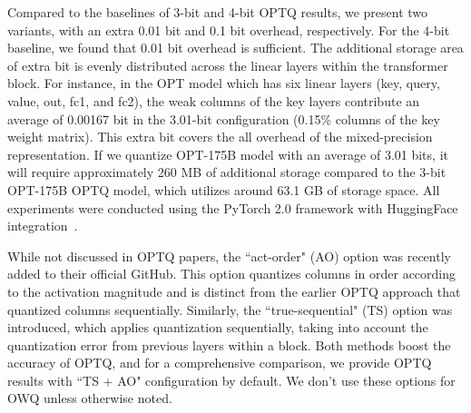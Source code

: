 \documentclass[letterpaper]{article} %
\begin{document}
Compared to the baselines of 3-bit and 4-bit OPTQ results, we present two variants, with an extra 0.01 bit and 0.1 bit overhead, respectively. For the 4-bit baseline, we found that 0.01 bit overhead is sufficient. The additional storage area of extra bit is evenly distributed across the linear layers within the transformer block. For instance, in the OPT model which has six linear layers (key, query, value, out, fc1, and fc2), the weak columns of the key layers contribute an average of 0.00167 bit in the 3.01-bit configuration (0.15\% columns of the key weight matrix). This extra bit covers the all overhead of the mixed-precision representation. If we quantize OPT-175B model with an average of 3.01 bits, it will require approximately 260 MB of additional storage compared to the 3-bit OPT-175B OPTQ model, which utilizes around 63.1 GB of storage space. All experiments were conducted using the PyTorch 2.0 \cite{paszke2019pytorch} framework with HuggingFace integration~\cite{wolf2019huggingface}.

While not discussed in OPTQ papers, the ``act-order" (AO) option was recently added to their official GitHub. This option quantizes columns in order according to the activation magnitude and is distinct from the earlier OPTQ approach that quantized columns sequentially. Similarly, the ``true-sequential" (TS) option was introduced, which applies quantization sequentially, taking into account the quantization error from previous layers within a block. Both methods boost the accuracy of OPTQ, and for a comprehensive comparison, we provide OPTQ results with ``TS + AO" configuration by default. We don't use these options for OWQ unless otherwise noted.
\end{document}
